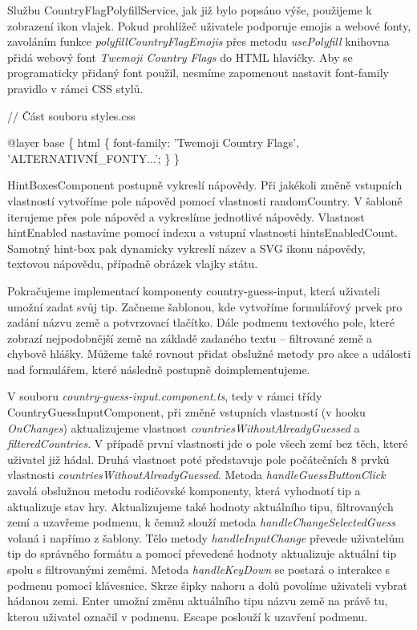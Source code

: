 Službu CountryFlagPolyfillService, jak již bylo popsáno výše, použijeme k zobrazení ikon vlajek. 
Pokud prohlížeč uživatele podporuje emojis a webové fonty, zavoláním funkce \emph{polyfillCountryFlagEmojis} přes metodu \emph{usePolyfill} knihovna přidá webový font \emph{Twemoji Country Flags} do HTML hlavičky.
Aby se programaticky přidaný font použil, nesmíme zapomenout nastavit font-family pravidlo v rámci CSS stylů.

\begin{prog}
// Část souboru styles.css

@layer base \{
  html \{
    font-family: 'Twemoji Country Flags', 'ALTERNATIVNÍ_FONTY...';
  \}
\}
\end{prog}

HintBoxesComponent postupně vykreslí nápovědy. Při jakékoli změně vstupních vlastností vytvoříme pole nápověd pomocí vlastnosti randomCountry. 
V šabloně iterujeme přes pole nápověd a vykreslíme jednotlivé nápovědy. Vlastnost hintEnabled nastavíme pomocí indexu a vstupní vlastnosti hintsEnabledCount. 
Samotný hint-box pak dynamicky vykreslí název a SVG ikonu nápovědy, textovou nápovědu, případně obrázek vlajky státu.

Pokračujeme implementací komponenty country-guess-input, která uživateli umožní zadat svůj tip. 
Začneme šablonou, kde vytvoříme formulářový prvek pro zadání názvu země a potvrzovací tlačítko. 
Dále podmenu textového pole, které zobrazí nejpodobnější země na základě zadaného textu -- filtrované země a chybové hlášky. 
Můžeme také rovnout přidat obslužné metody pro akce a události nad formulářem, které následně postupně doimplementujeme.

V souboru \emph{country-guess-input.component.ts}, tedy v rámci třídy CountryGuessInputComponent, při změně vstupních vlastností (v hooku \emph{OnChanges}) aktualizujeme vlastnost \emph{countriesWithoutAlreadyGuessed} a \emph{filteredCountries}. 
V případě první vlastnosti jde o pole všech zemí bez těch, které uživatel již hádal. Druhá vlastnost poté představuje pole počátečních 8 prvků vlastnosti \emph{countriesWithoutAlreadyGuessed}. 
Metoda \emph{handleGuessButtonClick} zavolá obslužnou metodu rodičovské komponenty, která vyhodnotí tip a aktualizuje stav hry. 
Aktualizujeme také hodnoty aktuálního tipu, filtrovaných zemí a uzavřeme podmenu, k čemuž slouží metoda \emph{handleChangeSelectedGuess} volaná i napřímo z šablony. 
Tělo metody \emph{handleInputChange} převede uživatelům tip do správného formátu a pomocí převedené hodnoty aktualizuje aktuální tip spolu s filtrovanými zeměmi.
Metoda \emph{handleKeyDown} se postará o interakce s podmenu pomocí klávesnice. Skrze šipky nahoru a dolů povolíme uživateli vybrat hádanou zemi. 
Enter umožní změnu aktuálního tipu názvu země na právě tu, kterou uživatel označil v podmenu. Escape poslouží k uzavření podmenu.

